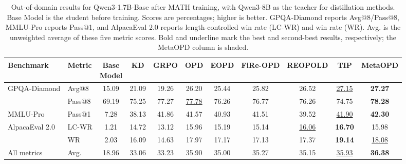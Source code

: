 \documentclass{article}
\theoremstyle{plain}
\theoremstyle{definition}
\theoremstyle{remark}
\begin{document}
\begin{table}[t]
\centering
\footnotesize
{}
\setlength{\tabcolsep}{2pt}
\renewcommand{\arraystretch}{1.10}
\caption{Out-of-domain results for Qwen3-1.7B-Base after MATH training, with Qwen3-8B as the teacher for distillation methods. Base Model is the student before training. Scores are percentages; higher is better. GPQA-Diamond reports Avg@8/Pass@8, MMLU-Pro reports Pass@1, and AlpacaEval 2.0 reports length-controlled win rate (LC-WR) and win rate (WR). Avg. is the unweighted average of these five metric scores. Bold and underline mark the best and second-best results, respectively; the MetaOPD column is shaded.}
\label{tab:ood-results}
\begin{tabular*}{\textwidth}{@{\extracolsep{\fill}}ll*{8}{c}>{\columncolor{MetaOODBg}}c@{}}
\toprule
Benchmark & Metric & \shortstack{Base\\Model} & KD & GRPO & OPD & EOPD & FiRe-OPD & REOPOLD & TIP & \textbf{MetaOPD} \\
\midrule
\multirow{2}{*}{GPQA-Diamond} & Avg@8 & 15.09 & 21.09 & 19.26 & 26.20 & 25.44 & 25.82 & 26.52 & \underline{27.15} & \textbf{27.27} \\
& Pass@8 & 69.19 & 75.25 & 77.27 & \underline{77.78} & 76.26 & 76.77 & 76.26 & 74.75 & \textbf{78.28} \\
\midrule
MMLU-Pro & Pass@1 & 7.28 & 38.13 & 41.86 & 41.57 & 40.93 & 41.51 & 39.52 & \underline{41.90} & \textbf{42.30} \\
\midrule
\multirow{2}{*}{AlpacaEval 2.0} & LC-WR & 1.21 & 14.72 & 13.12 & 15.96 & 15.19 & 15.14 & \underline{16.06} & \textbf{16.70} & 15.98 \\
& WR & 2.03 & 16.09 & 14.63 & 17.97 & 17.17 & 17.13 & 17.37 & \textbf{19.14} & \underline{18.08} \\
\midrule
All metrics & Avg. & 18.96 & 33.06 & 33.23 & 35.90 & 35.00 & 35.27 & 35.15 & \underline{35.93} & \textbf{36.38} \\
\bottomrule
\end{tabular*}
\end{table}



\end{document}
